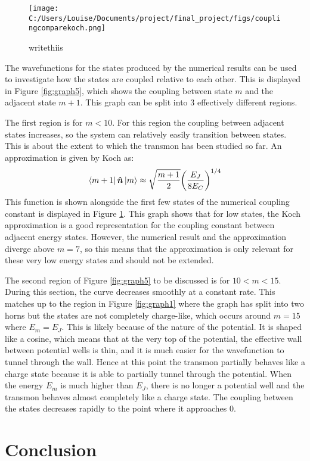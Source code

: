 \documentclass[11pt]{article}
\begin{document}
\begin{figure}[ht]
\centering
\texttt{[image: C:/Users/Louise/Documents/project/final\_project/figs/couplingcomparekoch.png]}
\caption{writethiis}
\label{fig:graph7}
\end{figure}
The wavefunctions for the states produced by the numerical results can be used to investigate how the states are coupled relative to each other. This is displayed in Figure \ref{fig:graph5}, which shows the coupling between state $m$ and the adjacent state $m+1$. This graph can be split into 3 effectively different regions.

 The first region is for $m<10$. For this region the coupling between adjacent states increases, so the system can relatively easily transition between states. This is about the extent to which the transmon has been studied so far. An approximation is given by Koch as:
\begin{equation} \label{eq:10}
\bra{m+1}\boldsymbol{\hat{n}}\ket{m} \approx \sqrt{\frac{m+1}{2}} \bigg( \frac{E_J}{8E_C}\bigg)^{1/4}
\end{equation}
This function is shown alongside the first few states of the numerical coupling constant is displayed in Figure \ref{fig:graph7}. This graph shows that for low states, the Koch approximation is a good representation for the coupling constant between adjacent energy states. However, the numerical result and the approximation diverge above $m=7$, so this means that the approximation is only relevant for these very low energy states and should not be extended.

The second region of Figure \ref{fig:graph5} to be discussed is for $10<m<15$. During this section, the curve decreases smoothly at a constant rate. This matches up to the region in Figure \ref{fig:graph1} where the graph has split into two horns but the states are not completely charge-like, which occurs around $m=15$ where $E_m = E_J$. This is likely because of the nature of the potential. It is shaped like a cosine, which means that at the very top of the potential, the effective wall between potential wells is thin, and it is much easier for the wavefunction to tunnel through the wall. Hence at this point the transmon partially behaves like a charge state because it is able to partially tunnel through the potential. When the energy $E_m$ is much higher than $E_J$, there is no longer a potential well and the transmon behaves almost completely like a charge state. The coupling between the states decreases rapidly to the point where it approaches 0.

\section{Conclusion}
\end{document}
